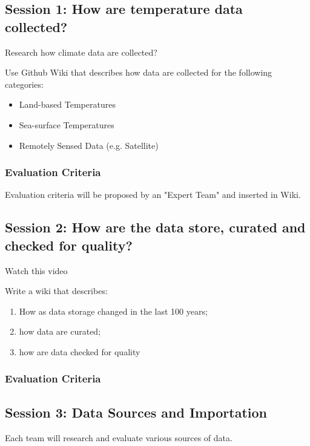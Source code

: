 \documentclass{article}\usepackage[]{graphicx}\usepackage[]{color}
\begin{document}
\subsection{Session 1: How are temperature data collected?}

Research how climate data are collected?

Use Github Wiki that describes how data are collected for the following categories:

\begin{itemize}
  \item Land-based Temperatures
  \item Sea-surface Temperatures
  \item Remotely Sensed Data (e.g. Satellite) 
\end{itemize}

\subsubsection{Evaluation Criteria}

Evaluation criteria will be proposed by an "Expert Team" and inserted in Wiki. 

\subsection{Session 2: How are the data store, curated and checked for quality?}

Watch this video

Write a wiki that describes: 

\begin{enumerate}
  \item How as data storage changed in the last 100 years;
  \item how data are curated; 
  \item how are data checked for quality
\end{enumerate}

\subsubsection{Evaluation Criteria}


\subsection{Session 3: Data Sources and Importation}

Each team will research and evaluate various sources of data.
\end{document}
